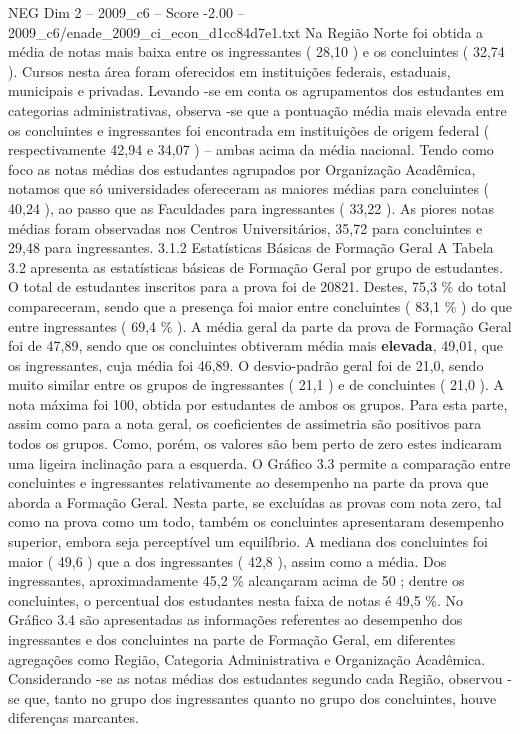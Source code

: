 \begin{textsample}{NEG Dim 2 – 2009\_c6 – Score -2.00 – 2009\_c6/enade\_2009\_ci\_econ\_d1cc84d7e1.txt}
Na Região Norte foi obtida a média de notas mais baixa entre os ingressantes ( 28,10 ) e os concluintes ( 32,74 ).
Cursos nesta área foram oferecidos em instituições federais, estaduais, municipais e privadas.
Levando -se em conta os agrupamentos dos estudantes em categorias administrativas, observa -se que a pontuação média mais elevada entre os concluintes e ingressantes foi encontrada em instituições de origem federal ( respectivamente 42,94 e 34,07 ) – ambas acima da média nacional.
Tendo como foco as notas médias dos estudantes agrupados por Organização Acadêmica, notamos que só universidades ofereceram as maiores médias para concluintes ( 40,24 ), ao passo que as Faculdades para ingressantes ( 33,22 ).
As piores notas médias foram observadas nos Centros Universitários, 35,72 para concluintes e 29,48 para ingressantes. 3.1.2 Estatísticas Básicas de Formação Geral A Tabela 3.2 apresenta as estatísticas básicas de Formação Geral por grupo de estudantes.
O total de estudantes inscritos para a prova foi de 20821.
Destes, 75,3 \% do total compareceram, sendo que a presença foi maior entre concluintes ( 83,1 \% ) do que entre ingressantes ( 69,4 \% ).
A média geral da parte da prova de Formação Geral foi de 47,89, sendo que os concluintes obtiveram média mais \textbf{elevada}, 49,01, que os ingressantes, cuja média foi 46,89.
O desvio-padrão geral foi de 21,0, sendo muito similar entre os grupos de ingressantes ( 21,1 ) e de concluintes ( 21,0 ).
A nota máxima foi 100, obtida por estudantes de ambos os grupos.
Para esta parte, assim como para a nota geral, os coeficientes de assimetria são positivos para todos os grupos.
Como, porém, os valores são bem perto de zero estes indicaram uma ligeira inclinação para a esquerda.
O Gráfico 3.3 permite a comparação entre concluintes e ingressantes relativamente ao desempenho na parte da prova que aborda a Formação Geral.
Nesta parte, se excluídas as provas com nota zero, tal como na prova como um todo, também os concluintes apresentaram desempenho superior, embora seja perceptível um equilíbrio.
A mediana dos concluintes foi maior ( 49,6 ) que a dos ingressantes ( 42,8 ), assim como a média.
Dos ingressantes, aproximadamente 45,2 \% alcançaram acima de 50 ; dentre os concluintes, o percentual dos estudantes nesta faixa de notas é 49,5 \%.
No Gráfico 3.4 são apresentadas as informações referentes ao desempenho dos ingressantes e dos concluintes na parte de Formação Geral, em diferentes agregações como Região, Categoria Administrativa e Organização Acadêmica.
Considerando -se as notas médias dos estudantes segundo cada Região, observou -se que, tanto no grupo dos ingressantes quanto no grupo dos concluintes, houve diferenças marcantes.

\end{textsample}

